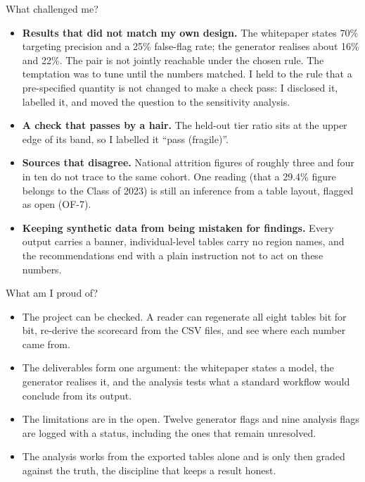 \documentclass[aspectratio=169,11pt,t]{beamer}
\newcommand{\key}[1]{\textcolor{keyresult}{\textbf{#1}}}
\begin{document}
\begin{frame}{What challenged me?}
  \small
  \begin{itemize}\setlength\itemsep{2pt}
    \item \key{Results that did not match my own design.} The whitepaper states 70\%
          targeting precision and a 25\% false-flag rate; the generator realises
          about 16\% and 22\%. The pair is not jointly reachable under the chosen rule.
          The temptation was to tune until the numbers matched. I held to the rule that
          a pre-specified quantity is not changed to make a check pass: I disclosed it,
          labelled it, and moved the question to the sensitivity analysis.
    \item \key{A check that passes by a hair.} The held-out tier ratio sits at the
          upper edge of its band, so I labelled it ``pass (fragile)''.
    \item \key{Sources that disagree.} National attrition figures of roughly three and
          four in ten do not trace to the same cohort. One reading (that a 29.4\%
          figure belongs to the Class of 2023) is still an inference from a table
          layout, flagged as open (OF-7).
    \item \key{Keeping synthetic data from being mistaken for findings.} Every output
          carries a banner, individual-level tables carry no region names, and the
          recommendations end with a plain instruction not to act on these numbers.
  \end{itemize}
\end{frame}

\begin{frame}{What am I proud of?}
  \begin{itemize}\setlength\itemsep{6pt}
    \item The project \alert{can be checked}. A reader can regenerate all eight tables
          bit for bit, re-derive the scorecard from the CSV files, and see where each
          number came from.
    \item The deliverables form \alert{one argument}: the whitepaper states a model,
          the generator realises it, and the analysis tests what a standard workflow
          would conclude from its output.
    \item The limitations are \alert{in the open}. Twelve generator flags and nine
          analysis flags are logged with a status, including the ones that remain
          unresolved.
    \item The analysis works from the exported tables alone and is only then graded
          against the truth, the discipline that keeps a result honest.
  \end{itemize}
\end{frame}
\end{document}
